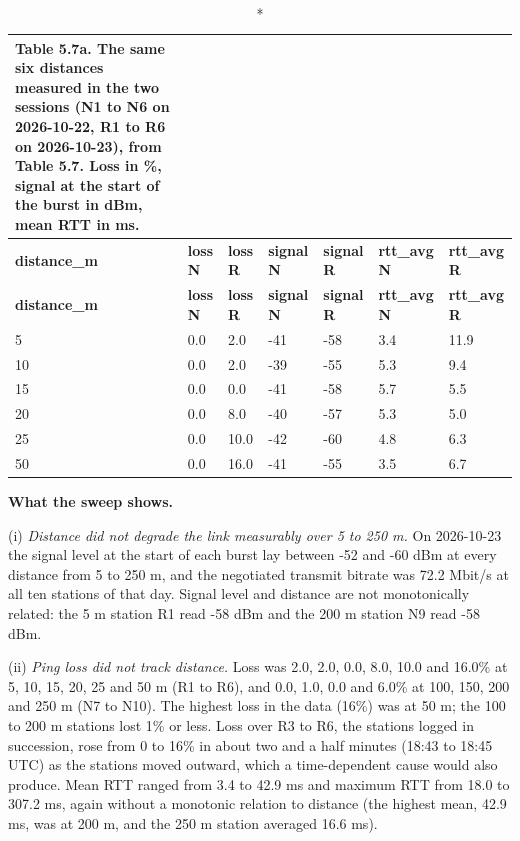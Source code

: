 \begin{center}
\begin{longtable}{|l|l|l|l|l|l|l|}
\caption*{Table 5.7a. The same six distances measured in the two sessions (N1 to N6 on 2026-10-22, R1 to R6 on 2026-10-23), from Table 5.7. Loss in \%, signal at the start of the burst in dBm, mean RTT in ms.}
\addcontentsline{lot}{table}{\protect\numberline{5.7a}The same six distances measured in the two sessions (N1 to N6 on 2026-10-22, R1 to R6 on 2026-10-23), from Table 5.7. Loss in \%, signal at the start of the burst in dBm, mean RTT in ms.}
\\
\hline
\textbf{distance\_m} & \textbf{loss N} & \textbf{loss R} & \textbf{signal N} & \textbf{signal R} & \textbf{rtt\_avg N} & \textbf{rtt\_avg R} \\
\hline
\endfirsthead
\hline
\textbf{distance\_m} & \textbf{loss N} & \textbf{loss R} & \textbf{signal N} & \textbf{signal R} & \textbf{rtt\_avg N} & \textbf{rtt\_avg R} \\
\hline
\endhead
5 & 0.0 & 2.0 & -41 & -58 & 3.4 & 11.9 \\
\hline
10 & 0.0 & 2.0 & -39 & -55 & 5.3 & 9.4 \\
\hline
15 & 0.0 & 0.0 & -41 & -58 & 5.7 & 5.5 \\
\hline
20 & 0.0 & 8.0 & -40 & -57 & 5.3 & 5.0 \\
\hline
25 & 0.0 & 10.0 & -42 & -60 & 4.8 & 6.3 \\
\hline
50 & 0.0 & 16.0 & -41 & -55 & 3.5 & 6.7 \\
\hline
\end{longtable}
\end{center}

\textbf{What the sweep shows.}

(i) \textit{Distance did not degrade the link measurably over 5 to 250 m.} On 2026-10-23 the signal level at the start of each burst lay between -52 and -60 dBm at every distance from 5 to 250 m, and the negotiated transmit bitrate was 72.2 Mbit/s at all ten stations of that day. Signal level and distance are not monotonically related: the 5 m station R1 read -58 dBm and the 200 m station N9 read -58 dBm.

(ii) \textit{Ping loss did not track distance.} Loss was 2.0, 2.0, 0.0, 8.0, 10.0 and 16.0\% at 5, 10, 15, 20, 25 and 50 m (R1 to R6), and 0.0, 1.0, 0.0 and 6.0\% at 100, 150, 200 and 250 m (N7 to N10). The highest loss in the data (16\%) was at 50 m; the 100 to 200 m stations lost 1\% or less. Loss over R3 to R6, the stations logged in succession, rose from 0 to 16\% in about two and a half minutes (18:43 to 18:45 UTC) as the stations moved outward, which a time-dependent cause would also produce. Mean RTT ranged from 3.4 to 42.9 ms and maximum RTT from 18.0 to 307.2 ms, again without a monotonic relation to distance (the highest mean, 42.9 ms, was at 200 m, and the 250 m station averaged 16.6 ms).

